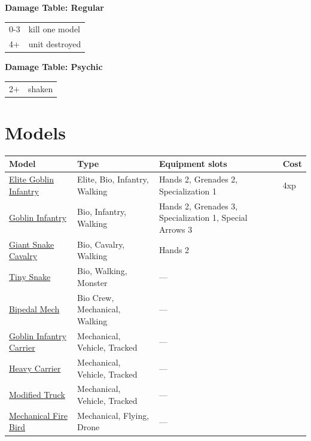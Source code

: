 \documentclass[a4paper,12pt]{article}
\begin{document}
\noindent\textbf{Damage Table: Regular}

\begin{tabular}{@{}lp{}@{}}
0-3 & kill one model \\
4+ & unit destroyed \\
\end{tabular}
\vspace{1ex}

\noindent\textbf{Damage Table: Psychic}

\begin{tabular}{@{}lp{}@{}}
2+ & shaken \\
\end{tabular}
\vspace{1ex}

\newpage
\section{Models}
\label{section-models}

\begin{longtable}{@{}p{}p{}p{}l@{}}
\textbf{Model} & \textbf{Type} & \textbf{Equipment slots} & \textbf{Cost} \\
\hline
\endhead
\hyperref[model-elite-goblin-infantry]{Elite Goblin Infantry} & Elite, Bio, Infantry, Walking & Hands 2, Grenades 2, Specialization 1 & 4xp \\
\hyperref[model-goblin-infantry]{Goblin Infantry} & Bio, Infantry, Walking & Hands 2, Grenades 3, Specialization 1, Special Arrows 3 &  \\
\hyperref[model-giant-snake-cavalry]{Giant Snake Cavalry} & Bio, Cavalry, Walking & Hands 2 &  \\
\hyperref[model-tiny-snake]{Tiny Snake} & Bio, Walking, Monster & --- &  \\
\hyperref[model-bipedal-mech]{Bipedal Mech} & Bio Crew, Mechanical, Walking & --- &  \\
\hyperref[model-goblin-infantry-carrier]{Goblin Infantry Carrier} & Mechanical, Vehicle, Tracked & --- &  \\
\hyperref[model-heavy-carrier]{Heavy Carrier} & Mechanical, Vehicle, Tracked & --- &  \\
\hyperref[model-modified-truck]{Modified Truck} & Mechanical, Vehicle, Tracked & --- &  \\
\hyperref[model-mechanical-fire-bird]{Mechanical Fire Bird} & Mechanical, Flying, Drone & --- &  \\
\end{longtable}
\end{document}
